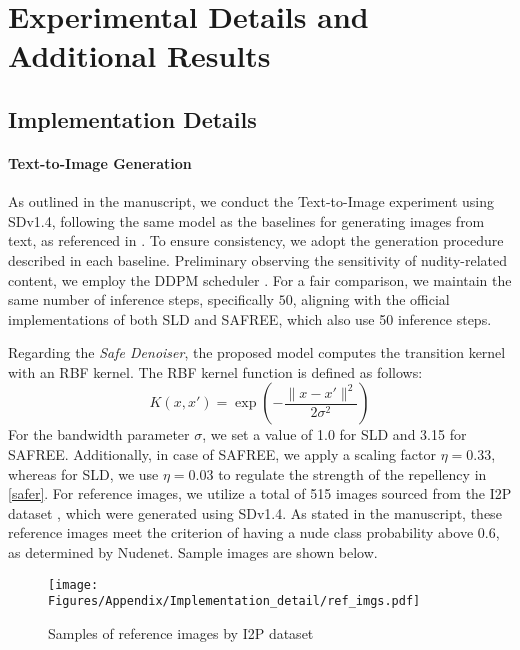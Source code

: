 \section{Experimental Details and Additional Results}
\label{suppsec:experiments}


\subsection{Implementation Details}
\paragraph{Text-to-Image Generation}

As outlined in the manuscript, we conduct the Text-to-Image experiment using SDv1.4, following the same model as the baselines for generating images from text, as referenced in \cite{schramowski2023safe, wu2024erasediff, gong2024reliable, yoon2024safree}. 
To ensure consistency, we adopt the generation procedure described in each baseline. 
Preliminary observing the sensitivity of nudity-related content, we employ the DDPM scheduler \cite{ho2020denoising}. %
For a fair comparison, we maintain the same number of inference steps, specifically $50$, aligning with the official implementations of both SLD and SAFREE, which also use 50 inference steps.

Regarding the \textit{Safe Denoiser}, the proposed model computes the transition kernel with an RBF kernel. 
%
%
The RBF kernel function is defined as follows:
\begin{equation}
\label{eq_rbf_kernel}
K(x, x') = \exp\left(-\frac{\lVert x - x'\rVert^2}{2\sigma^2}\right)
\end{equation}
For the bandwidth parameter $\sigma$, we set a value of 1.0 for SLD and 3.15 for SAFREE. 
Additionally, in case of SAFREE, we apply a scaling factor $\eta=0.33$, whereas for SLD, we use $\eta=0.03$ to regulate the strength of the repellency in \eqref{safer}.
For reference images, we utilize a total of 515 images sourced from the I2P dataset \cite{schramowski2023safe}, which were generated using SDv1.4. 
As stated in the manuscript, these reference images meet the criterion of having a nude class probability above 0.6, as determined by Nudenet. Sample images are shown below. 

\begin{figure}[h]
    \centering
    \texttt{[image: Figures/Appendix/Implementation\_detail/ref\_imgs.pdf]}
    \caption{Samples of reference images by I2P dataset}
    \label{fig:i2p_ref_imgs}
\end{figure}

